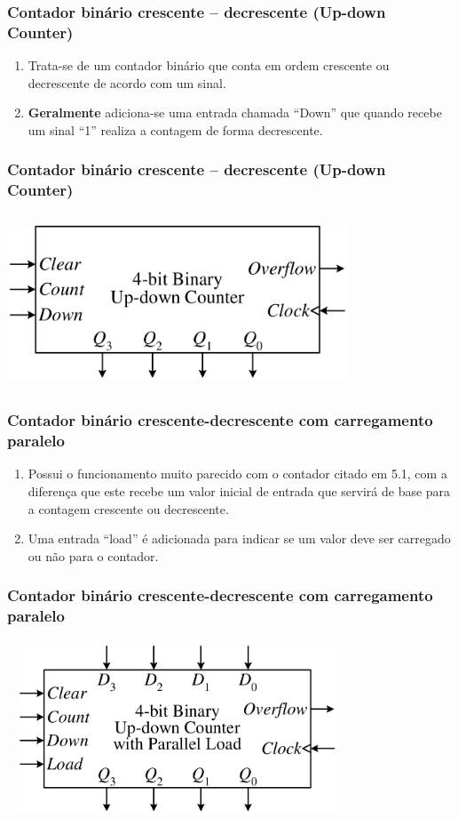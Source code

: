 \documentclass{beamer}
\begin{document}
\begin{frame}
  \frametitle{Contador binário crescente – decrescente (Up-down Counter)}
\begin{enumerate}
  \item Trata-se de um contador binário que conta em ordem crescente ou decrescente de acordo com um sinal. \pause
  \item \textbf{Geralmente} adiciona-se uma entrada chamada “Down” que quando recebe um sinal “1” realiza a contagem de forma decrescente.
 \end{enumerate}
\end{frame}

\begin{frame}
 \frametitle{Contador binário crescente – decrescente (Up-down Counter)}
  \includegraphics[height=2in, width=4in]{contador_crescente_decrescente.png}
\end{frame}

\begin{frame}
  \frametitle{Contador binário crescente-decrescente com carregamento paralelo}
 \begin{enumerate}
  \item Possui o funcionamento muito parecido com o contador citado em 5.1, com a diferença que este recebe um valor inicial de entrada que 
	servirá de base para a contagem crescente ou decrescente.\pause
  \item Uma entrada “load” é adicionada para indicar se um valor deve ser carregado ou não para o contador.
 \end{enumerate}
\end{frame}

\begin{frame}
 \frametitle{Contador binário crescente-decrescente com carregamento paralelo}
  \includegraphics[height=2in, width=4in]{contador_crescente_decrescente_com_entrada_paralela.png}
\end{frame}
\end{document}
